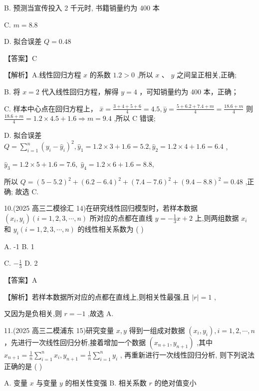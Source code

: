 \documentclass[10pt]{article}
\begin{document}
B. 预测当宣传投入 2 千元时, 书籍销量约为 400 本

C. \(m = {8.8}\)

D. 拟合误差 \(Q = {0.48}\)

【答案】C

【解析】A.线性回归方程 \(x\) 的系数 \({1.2} > 0\) ,所以 \(x\text{ 、 }y\) 之间呈正相关,正确;

B. 将 \(x = 2\) 代入线性回归方程，解得 \(y = 4\) ，可知销量约为 400 本，正确；

C. 样本中心点在回归方程上， \(\overset{ - }{x} = \frac{3 + 4 + 5 + 6}{4} = {4.5},\overset{ - }{y} = \frac{5 + {6.2} + {7.4} + m}{4} = \frac{{18.6} + m}{4}\) 则 \(\frac{{18.6} + m}{4} = {1.2} \times  {4.5} + {1.6} \Rightarrow  m = {9.4}\) ,所以 \(\mathrm{C}\) 错误;

D. 拟合误差 \(Q = \mathop{\sum }\limits_{{i = 1}}^{n}{\left( {y}_{i} - {\widehat{y}}_{i}\right) }^{2},{\widehat{y}}_{1} = {1.2} \times  3 + {1.6} = {5.2},{\widehat{y}}_{2} = {1.2} \times  4 + {1.6} = {6.4}\) ,

\({\widehat{y}}_{3} = {1.2} \times  5 + {1.6} = {7.6},\;{\widehat{y}}_{4} = {1.2} \times  6 + {1.6} = {8.8},\)

所以 \(Q = {\left( 5 - {5.2}\right) }^{2} + {\left( {6.2} - {6.4}\right) }^{2} + {\left( {7.4} - {7.6}\right) }^{2} + {\left( {9.4} - {8.8}\right) }^{2} = {0.48}\) ,正确; 故选 C.

10.(2025 高三二模徐汇 14)在研究线性回归模型时，若样本数据 \(\left( {{x}_{i},{y}_{i}}\right) \left( {i = 1,2,3,\cdots ,n}\right)\) 所对应的点都在直线 \(y =  - \frac{1}{3}x + 2\) 上,则两组数据 \({x}_{i}\) 和 \({y}_{i}\left( {i = 1,2,3,\cdots ,n}\right)\) 的线性相关系数为 ( )

A. -1 B. 1

C. \(- \frac{1}{3}\) D. 2

【答案】A

【解析】若样本数据所对应的点都在直线上,则相关性最强,且 \(\left| r\right|  = 1\) ,

又因为是负相关,则 \(r =  - 1\) ,故选 A.

11.(2025 高三二模浦东 15)研究变量 \(x,y\) 得到一组成对数据 \(\left( {{x}_{i},{y}_{i}}\right) ,i = 1,2,\cdots ,n\) ，先进行一次线性回归分析,接着增加一个数据 \(\left( {{x}_{n + 1},{y}_{n + 1}}\right)\) ,其中 \({x}_{n + 1} = \frac{1}{n}\mathop{\sum }\limits_{{i = 1}}^{n}{x}_{i},{y}_{n + 1} = \frac{1}{n}\mathop{\sum }\limits_{{i = 1}}^{n}{y}_{i}\) , 再重新进行一次线性回归分析, 则下列说法正确的是 ( )

A. 变量 \(x\) 与变量 \(y\) 的相关性变强 B. 相关系数 \(r\) 的绝对值变小
\end{document}
